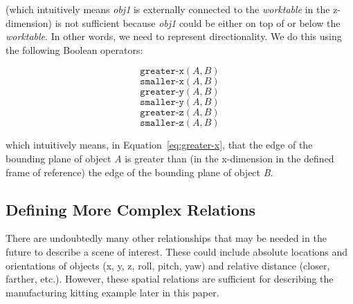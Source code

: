 \documentclass[preprint,12pt]{elsarticle}
\newcommand{\obj}[1] {\textit{#1}}
\begin{document}
(which intuitively means \obj{obj1} is externally connected to the \obj{worktable} in the z-dimension) is not sufficient because \obj{obj1} could be either on top of or below the \obj{worktable}. In other words, we need to represent directionality. We do this using the following Boolean operators:

\begin{equation}\label{eq:greater-x}
\texttt{greater-x}(\textit{A}, \textit{B})
\end{equation}
\begin{equation}\label{eq:smaller-x}
\texttt{smaller-x}(\textit{A}, \textit{B})
\end{equation}
\begin{equation}\label{eq:greater-y}
\texttt{greater-y}(\textit{A}, \textit{B})
\end{equation}
\begin{equation}\label{eq:smaller-y}
\texttt{smaller-y}(\textit{A}, \textit{B})
\end{equation}
\begin{equation}\label{eq:greater-z}
\texttt{greater-z}(\textit{A}, \textit{B})
\end{equation}
\begin{equation}\label{eq:smaller-z}
\texttt{smaller-z}(\textit{A}, \textit{B})
\end{equation}

which intuitively means, in Equation~\ref{eq:greater-x}, that the edge of the bounding plane of object \textit{A} is greater than (in the x-dimension in the defined frame of reference) the edge of the bounding plane of object \textit{B}.

\subsection{Defining More Complex Relations}
There are undoubtedly many other relationships that may be needed in the future to describe a scene of interest. These could include absolute locations and orientations of objects (x, y, z, roll, pitch, yaw) and relative distance (closer, farther, etc.). However, these spatial relations are sufficient for describing the manufacturing kitting example later in this paper.
\end{document}
